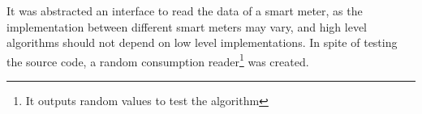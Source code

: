 
	It was abstracted an interface to read the data of a smart meter, as the implementation between different smart meters may vary, and high level algorithms should not depend on low level implementations. In spite of testing the source code, a random consumption reader\footnote{It outputs random values to test the algorithm} was created.
